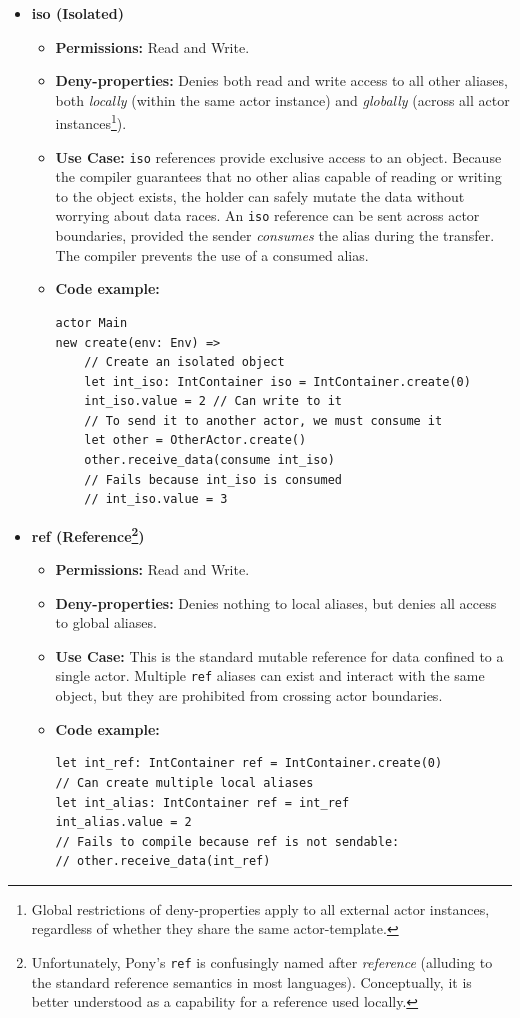 \begin{itemize}
    \item \textbf{iso (Isolated)}
    \begin{itemize}
        \item \textbf{Permissions:} Read and Write.
        \item \textbf{Deny-properties:} Denies both read and write access to all other aliases, both \textit{locally} (within the same actor instance) and \textit{globally} (across all actor instances\footnote{Global restrictions of deny-properties apply to all external actor instances, regardless of whether they share the same actor-template.}).
        \item \textbf{Use Case:} \texttt{iso} references provide exclusive access to an object. Because the compiler guarantees that no other alias capable of reading or writing to the object exists, the holder can safely mutate the data without worrying about data races. An \texttt{iso} reference can be sent across actor boundaries, provided the sender \textit{consumes} the alias during the transfer. The compiler prevents the use of a consumed alias.
        \item \textbf{Code example:}
\begin{verbatim}
actor Main
new create(env: Env) =>
    // Create an isolated object
    let int_iso: IntContainer iso = IntContainer.create(0)
    int_iso.value = 2 // Can write to it
    // To send it to another actor, we must consume it
    let other = OtherActor.create()
    other.receive_data(consume int_iso)
    // Fails because int_iso is consumed
    // int_iso.value = 3  
\end{verbatim}
    \end{itemize}
    \item \textbf{ref (Reference\footnote{Unfortunately, Pony's \texttt{ref} is confusingly named after \textit{reference} (alluding to the standard reference semantics in most languages). Conceptually, it is better understood as a capability for a reference used locally.})}
    \begin{itemize}
        \item \textbf{Permissions:} Read and Write.
        \item \textbf{Deny-properties:} Denies nothing to local aliases, but denies all access to global aliases.
        \item \textbf{Use Case:} This is the standard mutable reference for data confined to a single actor. Multiple \texttt{ref} aliases can exist and interact with the same object, but they are prohibited from crossing actor boundaries.
        \item \textbf{Code example:}
\begin{verbatim}
let int_ref: IntContainer ref = IntContainer.create(0)
// Can create multiple local aliases
let int_alias: IntContainer ref = int_ref
int_alias.value = 2
// Fails to compile because ref is not sendable:
// other.receive_data(int_ref)
\end{verbatim}
    \end{itemize}
    

\end{itemize}
